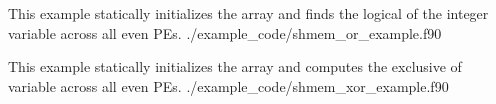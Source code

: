 \begin{apidefinition}
\begin{apiexamples}
\apifexample
    {This \Fortran{} example statically initializes the  array and finds
    the logical  of the integer variable  across all even
    \ac{PE}s.}
    {./example_code/shmem_or_example.f90}
    {}

\apifexample
    {This \Fortran{} example statically initializes the  array and
    computes the exclusive  of variable  across all even
    \ac{PE}s.}
    {./example_code/shmem_xor_example.f90}
    {} 

\end{apiexamples}

\end{apidefinition}
